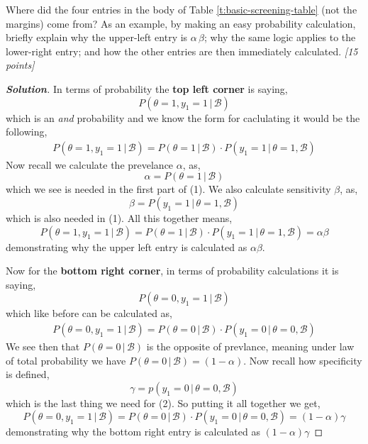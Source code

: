 \documentclass[12pt]{article}
\newcommand{\given}{\, | \,}
\newenvironment{solution}{\begin{proof}[\textbf{\textit{Solution}}] }{\end{proof}}
\begin{document}
\begin{itemize}
\begin{itemize}
Where did the four entries in the body of Table \ref{t:basic-screening-table} (not the margins) come from? As an example, by making an easy probability calculation, briefly explain why the upper-left entry is  $\alpha \, \beta$; why the same logic applies to the lower-right entry; and how the other entries are then immediately calculated. \textit{[15 points]}
\begin{tcolorbox}[breakable]
    \begin{solution}
        In terms of probability the \textbf{top left corner} is saying,
        \[P(\theta = 1, y_1 = 1 \given \mathcal{B})\]
        which is an \textit{and} probability and we know the form for caclulating it would be the following,
        \begin{align}
            P(\theta = 1, y_1 = 1 \given \mathcal{B}) = P(\theta = 1 \given \mathcal{B}) \cdot P(y_1 = 1 \given \theta = 1, \mathcal{B}) 
        \end{align}
        Now recall we calculate the prevelance $\alpha$, as,
        \[\alpha = P(\theta = 1\given \mathcal{B})\]
        which we see is needed in the first part of (1). We also calculate sensitivity $\beta$, as,
        \[\beta = P(y_1 = 1 \given \theta = 1, \mathcal{B})\]
        which is also needed in (1). All this together means,
        \[P(\theta = 1, y_1 = 1 \given \mathcal{B}) =  P(\theta = 1 \given \mathcal{B}) \cdot P(y_1 = 1 \given \theta = 1, \mathcal{B}) = \alpha \beta\]
        demonstrating why the upper left entry is calculated as $\alpha\beta$.

        Now for the \textbf{bottom right corner}, in terms of probability calculations it is saying,
        \[P(\theta = 0, y_1 = 1 \given \mathcal{B})\]
        which like before can be calculated as,
        \begin{align}
            P(\theta = 0, y_1 = 1 \given \mathcal{B}) = P(\theta = 0 \given \mathcal{B})\cdot P(y_1 = 0\given \theta = 0, \mathcal{B})
        \end{align}
        We see then that $P(\theta = 0 \given \mathcal{B})$ is the opposite of prevlance, meaning under law of total probability we have $P(\theta = 0 \given \mathcal{B}) = (1 - \alpha) $. Now recall how specificity is defined,
        \[\gamma = p(y_1 = 0\given \theta = 0, \mathcal{B})\]
        which is the last thing we need for (2). So putting it all together we get,
        \[P(\theta = 0, y_1 = 1 \given \mathcal{B}) = P(\theta = 0 \given \mathcal{B})\cdot P(y_1 = 0\given \theta = 0, \mathcal{B}) = (1-\alpha)\gamma\] 
        demonstrating why the bottom right entry is calculated as $(1-\alpha)\gamma$


\end{solution}
\end{tcolorbox}
\end{itemize}
\end{itemize}
\end{document}
